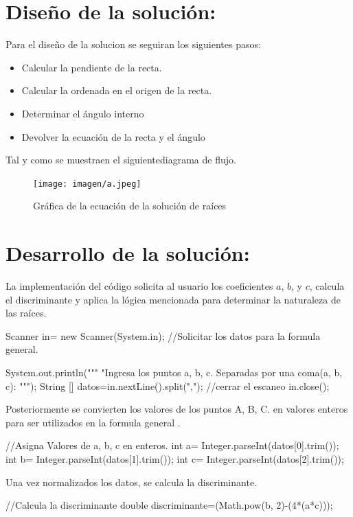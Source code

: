 \documentclass{IEEEcsmag}
\begin{document}
\newpage

\section*{Diseño de la solución:}

Para el diseño de la solucion se seguiran los siguientes pasos:
\begin{itemize}
    \item Calcular la pendiente de la recta.
    \item Calcular la ordenada en el origen de la recta.
    \item Determinar el ángulo interno
    \item Devolver la ecuación de la recta y el ángulo
\end{itemize}

Tal y como se muestraen el siguientediagrama de flujo.

\begin{figure}[h!]
    \centering
    \texttt{[image: imagen/a.jpeg]}
    \caption{Gráfica de la ecuación de la solución de raíces}
    \label{fig:GraficaEcuacionRecta}
\end{figure}

\section*{Desarrollo de la solución:}
La implementación del código solicita al usuario los coeficientes \(a\), \(b\), y \(c\), calcula el discriminante y aplica la lógica mencionada para determinar la naturaleza de las raíces. 
\begin{javaCode}
 Scanner in= new Scanner(System.in);
        //Solicitar los datos para la formula general.
        
        System.out.println("""
                           "Ingresa los puntos a, b, c.
                           Separadas por una coma(a, b, c): 
                           """);
        String [] datos=in.nextLine().split(",");
        //cerrar el escaneo
        in.close();
        
\end{javaCode}
\newpage
Posteriormente se convierten los valores de los puntos A, B, C. en valores enteros para ser utilizados  en la formula general .

\begin{javaCode}
    //Asigna Valores de a, b, c en enteros.
        int a= Integer.parseInt(datos[0].trim());
        int b= Integer.parseInt(datos[1].trim());
        int c= Integer.parseInt(datos[2].trim());
        
\end{javaCode}
Una vez normalizados los datos, se calcula la discriminante.
\begin{javaCode}
    //Calcula la discriminante
    double discriminante=(Math.pow(b, 2)-(4*(a*c)));
\end{javaCode}
\end{document}
